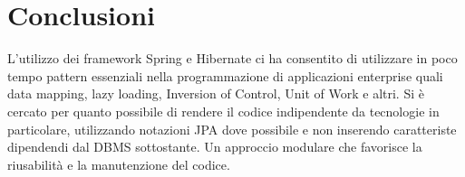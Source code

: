 \chapter{Conclusioni}

L'utilizzo dei framework Spring e Hibernate ci ha consentito di
utilizzare in poco tempo pattern essenziali nella programmazione di
applicazioni enterprise quali data mapping, lazy loading, Inversion of
Control, Unit of Work e altri. Si è cercato per quanto possibile di
rendere il codice indipendente da tecnologie in particolare,
utilizzando notazioni JPA dove possibile e non inserendo caratteriste
dipendendi dal DBMS sottostante. Un approccio modulare che favorisce
la riusabilità e la manutenzione del codice.


